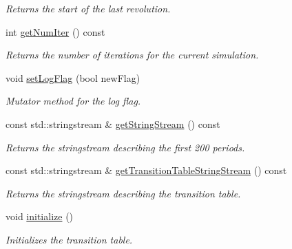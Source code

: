 \begin{DoxyCompactItemize}
\begin{DoxyCompactList}\small\item\em Returns the start of the last revolution. \end{DoxyCompactList}\item 
\mbox{\label{classSGSimulator_a990de1197b299b398c8fa6d22098b7da}} 
int \hyperlink{classSGSimulator_a990de1197b299b398c8fa6d22098b7da}{get\+Num\+Iter} () const
\begin{DoxyCompactList}\small\item\em Returns the number of iterations for the current simulation. \end{DoxyCompactList}\item 
\mbox{\label{classSGSimulator_afab1a623b20f64f81b4938840493f298}} 
void \hyperlink{classSGSimulator_afab1a623b20f64f81b4938840493f298}{set\+Log\+Flag} (bool new\+Flag)
\begin{DoxyCompactList}\small\item\em Mutator method for the log flag. \end{DoxyCompactList}\item 
\mbox{\label{classSGSimulator_aa745e89e85fa5d8dc4a49ec3b116688d}} 
const std\+::stringstream \& \hyperlink{classSGSimulator_aa745e89e85fa5d8dc4a49ec3b116688d}{get\+String\+Stream} () const
\begin{DoxyCompactList}\small\item\em Returns the stringstream describing the first 200 periods. \end{DoxyCompactList}\item 
\mbox{\label{classSGSimulator_ab53d5b0fe325b256de0f5cd92b60a88e}} 
const std\+::stringstream \& \hyperlink{classSGSimulator_ab53d5b0fe325b256de0f5cd92b60a88e}{get\+Transition\+Table\+String\+Stream} () const
\begin{DoxyCompactList}\small\item\em Returns the stringstream describing the transition table. \end{DoxyCompactList}\item 
\mbox{\label{classSGSimulator_a1997cb6546587e80102a430240315a14}} 
void \hyperlink{classSGSimulator_a1997cb6546587e80102a430240315a14}{initialize} ()
\begin{DoxyCompactList}\small\item\em Initializes the transition table. \end{DoxyCompactList}\item 

\end{DoxyCompactItemize}
